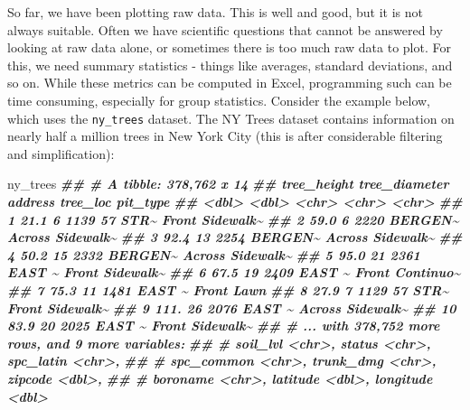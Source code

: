 \documentclass[
]{krantz}
\newenvironment{Shaded}{\begin{snugshade}}{\end{snugshade}}
\newcommand{\DocumentationTok}[1]{\textcolor[rgb]{0.56,0.35,0.01}{\textbf{\textit{#1}}}}
\newcommand{\NormalTok}[1]{#1}
\begin{document}
So far, we have been plotting raw data. This is well and good, but it is not always suitable. Often we have scientific questions that cannot be answered by looking at raw data alone, or sometimes there is too much raw data to plot. For this, we need summary statistics - things like averages, standard deviations, and so on. While these metrics can be computed in Excel, programming such can be time consuming, especially for group statistics. Consider the example below, which uses the \texttt{ny\_trees} dataset. The NY Trees dataset contains information on nearly half a million trees in New York City (this is after considerable filtering and simplification):

\begin{Shaded}
\begin{Highlighting}[]
\NormalTok{ny\_trees}
\DocumentationTok{\#\# \# A tibble: 378,762 x 14}
\DocumentationTok{\#\#    tree\_height tree\_diameter address      tree\_loc pit\_type }
\DocumentationTok{\#\#          \textless{}dbl\textgreater{}         \textless{}dbl\textgreater{} \textless{}chr\textgreater{}        \textless{}chr\textgreater{}    \textless{}chr\textgreater{}    }
\DocumentationTok{\#\#  1        21.1             6 1139 57 STR\textasciitilde{} Front    Sidewalk\textasciitilde{}}
\DocumentationTok{\#\#  2        59.0             6 2220 BERGEN\textasciitilde{} Across   Sidewalk\textasciitilde{}}
\DocumentationTok{\#\#  3        92.4            13 2254 BERGEN\textasciitilde{} Across   Sidewalk\textasciitilde{}}
\DocumentationTok{\#\#  4        50.2            15 2332 BERGEN\textasciitilde{} Across   Sidewalk\textasciitilde{}}
\DocumentationTok{\#\#  5        95.0            21 2361 EAST  \textasciitilde{} Front    Sidewalk\textasciitilde{}}
\DocumentationTok{\#\#  6        67.5            19 2409 EAST  \textasciitilde{} Front    Continuo\textasciitilde{}}
\DocumentationTok{\#\#  7        75.3            11 1481 EAST  \textasciitilde{} Front    Lawn     }
\DocumentationTok{\#\#  8        27.9             7 1129 57 STR\textasciitilde{} Front    Sidewalk\textasciitilde{}}
\DocumentationTok{\#\#  9       111.             26 2076 EAST  \textasciitilde{} Across   Sidewalk\textasciitilde{}}
\DocumentationTok{\#\# 10        83.9            20 2025 EAST  \textasciitilde{} Front    Sidewalk\textasciitilde{}}
\DocumentationTok{\#\# \# ... with 378,752 more rows, and 9 more variables:}
\DocumentationTok{\#\# \#   soil\_lvl \textless{}chr\textgreater{}, status \textless{}chr\textgreater{}, spc\_latin \textless{}chr\textgreater{},}
\DocumentationTok{\#\# \#   spc\_common \textless{}chr\textgreater{}, trunk\_dmg \textless{}chr\textgreater{}, zipcode \textless{}dbl\textgreater{},}
\DocumentationTok{\#\# \#   boroname \textless{}chr\textgreater{}, latitude \textless{}dbl\textgreater{}, longitude \textless{}dbl\textgreater{}}
\end{Highlighting}
\end{Shaded}
\end{document}
